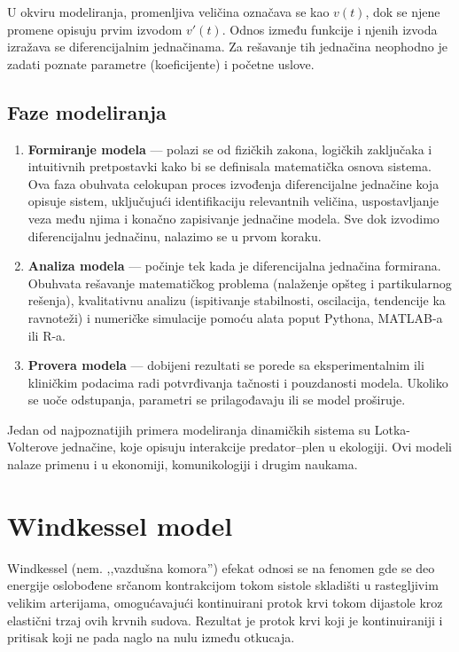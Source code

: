\documentclass[12pt,a4paper]{article}
\begin{document}
U okviru modeliranja, promenljiva veličina označava se kao $v(t)$, dok se njene promene opisuju prvim izvodom $v'(t)$. Odnos između funkcije i njenih izvoda izražava se diferencijalnim jednačinama. Za rešavanje tih jednačina neophodno je zadati poznate parametre (koeficijente) i početne uslove.

\subsection{Faze modeliranja}

\begin{enumerate}
    \item \textbf{Formiranje modela} --- polazi se od fizičkih zakona, logičkih zaključaka i intuitivnih pretpostavki kako bi se definisala matematička osnova sistema. Ova faza obuhvata celokupan proces izvođenja diferencijalne jednačine koja opisuje sistem, uključujući identifikaciju relevantnih veličina, uspostavljanje veza među njima i konačno zapisivanje jednačine modela. Sve dok izvodimo diferencijalnu jednačinu, nalazimo se u prvom koraku.

    \item \textbf{Analiza modela} --- počinje tek kada je diferencijalna jednačina formirana. Obuhvata rešavanje matematičkog problema (nalaženje opšteg i partikularnog rešenja), kvalitativnu analizu (ispitivanje stabilnosti, oscilacija, tendencije ka ravnoteži) i numeričke simulacije pomoću alata poput Pythona, MATLAB-a ili R-a.

    \item \textbf{Provera modela} --- dobijeni rezultati se porede sa eksperimentalnim ili kliničkim podacima radi potvrđivanja tačnosti i pouzdanosti modela. Ukoliko se uoče odstupanja, parametri se prilagođavaju ili se model proširuje.
\end{enumerate}

Jedan od najpoznatijih primera modeliranja dinamičkih sistema su Lotka-Volterove jednačine, koje opisuju interakcije predator--plen u ekologiji. Ovi modeli nalaze primenu i u ekonomiji, komunikologiji i drugim naukama.

\section{Windkessel model}

Windkessel (nem. ,,vazdušna komora'') efekat odnosi se na fenomen gde se deo energije oslobođene srčanom kontrakcijom tokom sistole skladišti u rastegljivim velikim arterijama, omogućavajući kontinuirani protok krvi tokom dijastole kroz elastični trzaj ovih krvnih sudova. Rezultat je protok krvi koji je kontinuiraniji i pritisak koji ne pada naglo na nulu između otkucaja.
\end{document}
